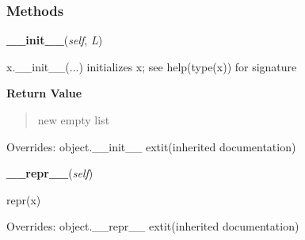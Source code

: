 
  \subsubsection{Methods}

    \vspace{0.5ex}

\hspace{.8\funcindent}\begin{boxedminipage}{\funcwidth}

    \raggedright \textbf{\_\_init\_\_}(\textit{self}, \textit{L})

\setlength{\parskip}{2ex}
    x.\_\_init\_\_(...) initializes x; see help(type(x)) for signature

\setlength{\parskip}{1ex}
      \textbf{Return Value}
    \vspace{-1ex}

      \begin{quote}
      new empty list

      \end{quote}

      Overrides: object.\_\_init\_\_ 	extit{(inherited documentation)}

    \end{boxedminipage}

    \vspace{0.5ex}

\hspace{.8\funcindent}\begin{boxedminipage}{\funcwidth}

    \raggedright \textbf{\_\_repr\_\_}(\textit{self})

\setlength{\parskip}{2ex}
    repr(x)

\setlength{\parskip}{1ex}
      Overrides: object.\_\_repr\_\_ 	extit{(inherited documentation)}

    \end{boxedminipage}

    \label{displayShip:InfosBoth:maxL1}

    \vspace{0.5ex}

